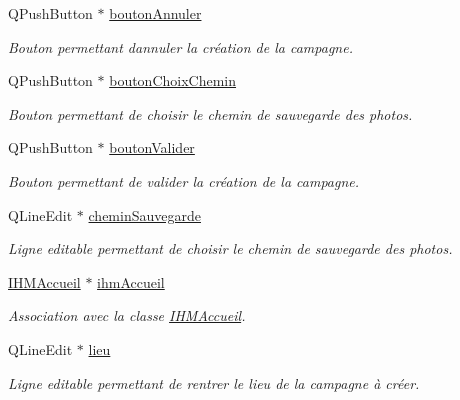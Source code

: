 \begin{DoxyCompactItemize}
\item 
Q\+Push\+Button $\ast$ \hyperlink{class_i_h_m_creation_campagne_ab20ebd5f09b98103c682ed2e1b192a1d}{bouton\+Annuler}
\begin{DoxyCompactList}\small\item\em Bouton permettant d\textquotesingle{}annuler la création de la campagne. \end{DoxyCompactList}\item 
Q\+Push\+Button $\ast$ \hyperlink{class_i_h_m_creation_campagne_ab709b06a83d8e1ebf9c920e7c60e2d79}{bouton\+Choix\+Chemin}
\begin{DoxyCompactList}\small\item\em Bouton permettant de choisir le chemin de sauvegarde des photos. \end{DoxyCompactList}\item 
Q\+Push\+Button $\ast$ \hyperlink{class_i_h_m_creation_campagne_a7c1dbc0141ba19b9ac16ea1444cd5d6f}{bouton\+Valider}
\begin{DoxyCompactList}\small\item\em Bouton permettant de valider la création de la campagne. \end{DoxyCompactList}\item 
Q\+Line\+Edit $\ast$ \hyperlink{class_i_h_m_creation_campagne_a95c12e2d42063f9c510704b87e3357da}{chemin\+Sauvegarde}
\begin{DoxyCompactList}\small\item\em Ligne editable permettant de choisir le chemin de sauvegarde des photos. \end{DoxyCompactList}\item 
\hyperlink{class_i_h_m_accueil}{I\+H\+M\+Accueil} $\ast$ \hyperlink{class_i_h_m_creation_campagne_a6b5ea4a52138016a07a37060669288ae}{ihm\+Accueil}
\begin{DoxyCompactList}\small\item\em Association avec la classe \hyperlink{class_i_h_m_accueil}{I\+H\+M\+Accueil}. \end{DoxyCompactList}\item 
Q\+Line\+Edit $\ast$ \hyperlink{class_i_h_m_creation_campagne_af68a722acc97a1011ff82752169a2ac8}{lieu}
\begin{DoxyCompactList}\small\item\em Ligne editable permettant de rentrer le lieu de la campagne à créer. \end{DoxyCompactList}\item 

\end{DoxyCompactItemize}
